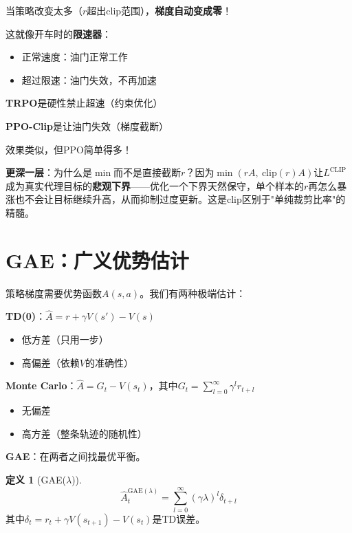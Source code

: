 \documentclass[11pt,a4paper]{article}
\theoremstyle{definition}
\newtheorem{definition}{定义}[section]
\begin{document}
\begin{keypoint}
当策略改变太多（$r$超出clip范围），\textbf{梯度自动变成零}！

这就像开车时的\textbf{限速器}：
\begin{itemize}
    \item 正常速度：油门正常工作
    \item 超过限速：油门失效，不再加速
\end{itemize}

\textbf{TRPO}是硬性禁止超速（约束优化）

\textbf{PPO-Clip}是让油门失效（梯度截断）

效果类似，但PPO简单得多！

\textbf{更深一层}：为什么是$\min$而不是直接截断$r$？因为$\min(rA,\ \text{clip}(r)A)$让$L^{\text{CLIP}}$成为真实代理目标的\textbf{悲观下界}——优化一个下界天然保守，单个样本的$r$再怎么暴涨也不会让目标继续升高，从而抑制过度更新。这是clip区别于"单纯裁剪比率"的精髓。
\end{keypoint}

\section{GAE：广义优势估计}

\begin{plainwords}[回顾优势估计的问题]
策略梯度需要优势函数$A(s,a)$。我们有两种极端估计：

\textbf{TD(0)}：$\hat{A} = r + \gamma V(s') - V(s)$
\begin{itemize}
    \item 低方差（只用一步）
    \item 高偏差（依赖$V$的准确性）
\end{itemize}

\textbf{Monte Carlo}：$\hat{A} = G_t - V(s_t)$，其中$G_t = \sum_{l=0}^\infty \gamma^l r_{t+l}$
\begin{itemize}
    \item 无偏差
    \item 高方差（整条轨迹的随机性）
\end{itemize}

\textbf{GAE}：在两者之间找最优平衡。
\end{plainwords}

\begin{definition}[GAE($\lambda$)]
\[
\hat{A}^{\text{GAE}(\lambda)}_t = \sum_{l=0}^\infty (\gamma\lambda)^l \delta_{t+l}
\]
其中$\delta_t = r_t + \gamma V(s_{t+1}) - V(s_t)$是TD误差。
\end{definition}
\end{document}
